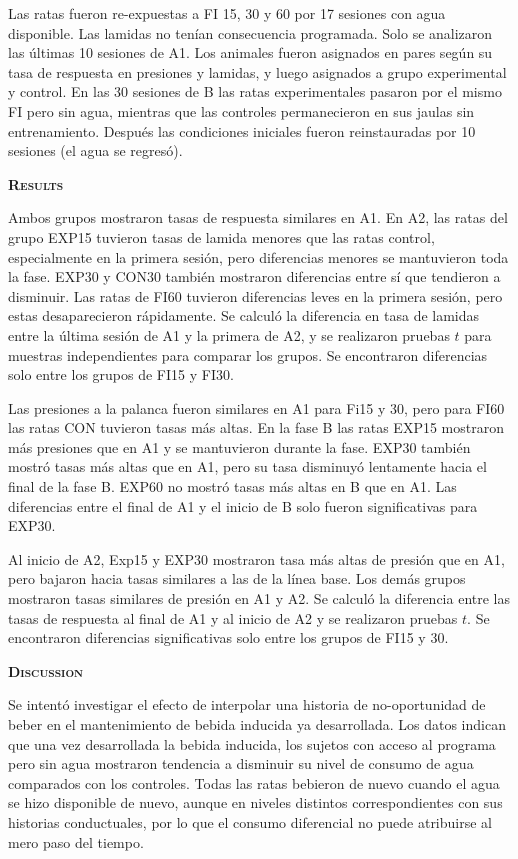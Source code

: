 \documentclass[a4paper,12pt]{article}
\begin{document}
Las ratas fueron re-expuestas a FI 15, 30 y 60 por 17 sesiones con agua disponible. Las lamidas no tenían consecuencia programada. Solo se analizaron las últimas 10 sesiones de A1. Los animales fueron asignados en pares según su tasa de respuesta en presiones y lamidas, y luego asignados a grupo experimental y control. En las 30 sesiones de B las ratas experimentales pasaron por el mismo FI pero sin agua, mientras que las controles permanecieron en sus jaulas sin entrenamiento. Después las condiciones iniciales fueron reinstauradas por 10 sesiones (el agua se regresó).

{\scshape\bfseries Results}

Ambos grupos mostraron tasas de respuesta similares en A1. En A2, las ratas del grupo EXP15 tuvieron tasas de lamida menores que las ratas control, especialmente en la primera sesión, pero diferencias menores se mantuvieron toda la fase. EXP30 y CON30 también mostraron diferencias entre sí que tendieron a disminuir. Las ratas de FI60 tuvieron diferencias leves en la primera sesión, pero estas desaparecieron rápidamente. Se calculó la diferencia en tasa de lamidas entre la última sesión de A1 y la primera de A2, y se realizaron pruebas $t$ para muestras independientes para comparar los grupos. Se encontraron diferencias solo entre los grupos de FI15 y FI30.

Las presiones a la palanca fueron similares en A1 para Fi15 y 30, pero para FI60 las ratas CON tuvieron tasas más altas. En la fase B las ratas EXP15 mostraron más presiones que en A1 y se mantuvieron durante la fase. EXP30 también mostró tasas más altas que en A1, pero su tasa disminuyó lentamente hacia el final de la fase B. EXP60 no mostró tasas más altas en B que en A1. Las diferencias entre el final de A1 y el inicio de B solo fueron significativas para EXP30.

Al inicio de A2, Exp15 y EXP30 mostraron tasa más altas de presión que en A1, pero bajaron hacia tasas similares a las de la línea base. Los demás grupos mostraron tasas similares de presión en A1 y A2. Se calculó la diferencia entre las tasas de respuesta al final de A1 y al inicio de A2 y se realizaron pruebas $t$. Se encontraron diferencias significativas solo entre los grupos de FI15 y 30.

{\scshape\bfseries Discussion}

Se intentó investigar el efecto de interpolar una historia de no-oportunidad de beber en el mantenimiento de bebida inducida ya desarrollada. Los datos indican que una vez desarrollada la bebida inducida, los sujetos con acceso al programa pero sin agua mostraron tendencia a disminuir su nivel de consumo de agua comparados con los controles. Todas las ratas bebieron de nuevo cuando el agua se hizo disponible de nuevo, aunque en niveles distintos correspondientes con sus historias conductuales, por lo que el consumo diferencial no puede atribuirse al mero paso del tiempo.
\end{document}
